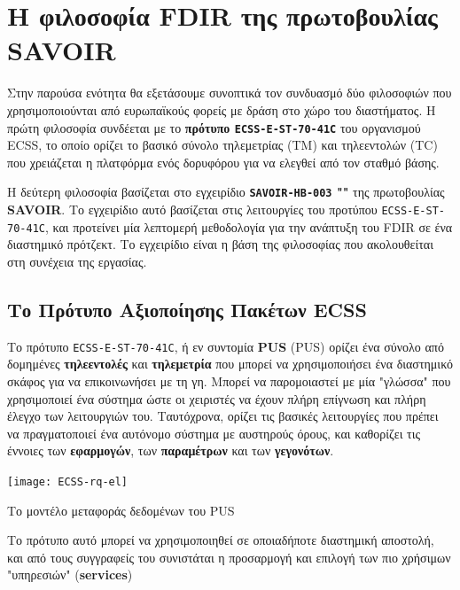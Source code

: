 \documentclass[a4paper,nobib]{tufte-book}
\begin{document}
\chapter{Η φιλοσοφία \acs{FDIR} της πρωτοβουλίας SAVOIR}
\label{cap:savoir}

Στην παρούσα ενότητα θα εξετάσουμε συνοπτικά τον συνδυασμό δύο φιλοσοφιών που χρησιμοποιούνται από ευρωπαϊκούς φορείς με δράση στο χώρο του διαστήματος. Η πρώτη φιλοσοφία συνδέεται με το \textbf{πρότυπο \texttt{ECSS-E-ST-70-41C}} \autocite{ECSS-E-ST-70-41C} του οργανισμού \acf{ECSS}, το οποίο ορίζει το βασικό σύνολο τηλεμετρίας (\acs{TM}) και τηλεεντολών (\acs{TC}) που χρειάζεται η πλατφόρμα ενός δορυφόρου για να ελεγθεί από τον σταθμό βάσης.

Η δεύτερη φιλοσοφία βασίζεται στο εγχειρίδιο \textbf{\texttt{SAVOIR-HB-003} ""} \autocite{SAVOIR-HB-003} της πρωτοβουλίας \textbf{\acf{SAVOIR}}. Το εγχειρίδιο αυτό βασίζεται στις λειτουργίες του προτύπου \texttt{ECSS-E-ST-70-41C}, και προτείνει μία λεπτομερή μεθοδολογία για την ανάπτυξη του \ac{FDIR} σε ένα διαστημικό πρότζεκτ. Το εγχειρίδιο είναι η βάση της φιλοσοφίας που ακολουθείται στη συνέχεια της εργασίας.

\section{Το Πρότυπο Αξιοποίησης Πακέτων \acs{ECSS}}
\label{sec:pus}


Το πρότυπο \texttt{ECSS-E-ST-70-41C}, ή εν συντομία \textbf{\acs{PUS}} (\acl{PUS}) ορίζει ένα σύνολο από δομημένες \textbf{τηλεεντολές} και \textbf{τηλεμετρία} που μπορεί να χρησιμοποιήσει ένα διαστημικό σκάφος για να επικοινωνήσει με τη γη. Μπορεί να παρομοιαστεί με μία "γλώσσα" που χρησιμοποιεί ένα σύστημα ώστε οι χειριστές να έχουν πλήρη επίγνωση και πλήρη έλεγχο των λειτουργιών του. Ταυτόχρονα, ορίζει τις βασικές λειτουργίες που πρέπει να πραγματοποιεί ένα αυτόνομο σύστημα με αυστηρούς όρους, και καθορίζει τις έννοιες των \textbf{εφαρμογών}, των \textbf{παραμέτρων} και των \textbf{γεγονότων}.

\begin{marginfigure}
	\texttt{[image: ECSS-rq-el]}
	\caption[]{Το μοντέλο μεταφοράς δεδομένων του \ac{PUS}}
	\label{fig:pusmodel}
\end{marginfigure}

Το πρότυπο αυτό μπορεί να χρησιμοποιηθεί σε οποιαδήποτε διαστημική αποστολή, και από τους συγγραφείς του συνιστάται η προσαρμογή και επιλογή των πιο χρήσιμων "υπηρεσιών" (\textbf{services})  \autocite{ECSS-E-ST-70-41C,ECSS-E-70-41A,kaufeler_esa_standard_1994}
\end{document}
